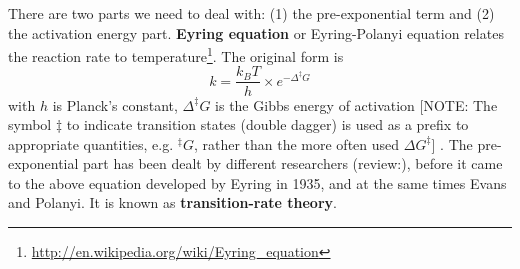 There are two parts we need to deal with: (1) the pre-exponential term and (2)
the activation energy part. {\bf Eyring equation} or Eyring-Polanyi equation
relates the reaction rate to
temperature\footnote{\url{http://en.wikipedia.org/wiki/Eyring_equation}}. The
original form is
\begin{equation}
k = \frac{k_BT}{h}\times e^{-\Delta ^\ddagger G}
\end{equation}
with $h$ is Planck's constant, $\Delta ^\ddagger G$ is the Gibbs energy of
activation [NOTE:
The symbol $\ddagger$ to indicate transition states (double dagger) is used as a prefix
to appropriate quantities, e.g. $^\ddagger G$, rather than the more often used
$\Delta G^\ddagger$] \citep{muller1994}. The pre-exponential part has been dealt
by different researchers (review:\citep{laidler1983}), before it came to the
above equation developed by Eyring in 1935, and at the same times Evans and Polanyi.
It is known as {\bf transition-rate  theory}.

